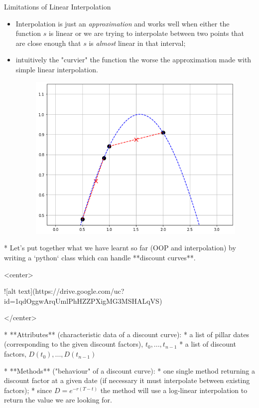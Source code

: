\documentclass{beamer}
\begin{document}
\begin{frame}{Limitations of Linear Interpolation}
  \begin{itemize}
    \item Interpolation is just an \emph{approximation} and works well when either the function $s$ is linear or we are trying to interpolate between two points that are close enough that $s$ is \emph{almost} linear in that interval;
    \item intuitively the "curvier" the function the worse the approximation made with simple linear interpolation.
    \begin{figure}[h]
      \begin{center}
        \includegraphics[width=0.55\linewidth]{interp3}
      \end{center}
    \end{figure}
  \end{itemize}
\end{frame}



* Let's put together what we have learnt so far (OOP and interpolation) by writing a `python` class which can handle **discount curves**.

<center>

![alt text](https://drive.google.com/uc?id=1qdOggwArqUmlPhHZZPXigMG3MSHALqVS)

</center> 

* **Attributes** (characteristic data of a discount curve):
  * a list of pillar dates (corresponding to the given discount factors), $t_0,...,t_{n-1}$
  * a list of discount factors, $D(t_0),...,D(t_{n-1})$

* **Methods** ("behaviour" of a discount curve):
  * one single method returning a discount factor at a given date (if necessary it must interpolate between existing factors);
  * since $D=e^{-r(T-t)}$ the method will use a log-linear interpolation to return the value we are looking for.
\end{document}

